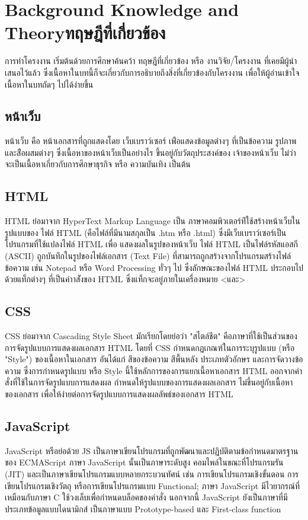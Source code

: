 \chapter{\ifenglish Background Knowledge and Theory\else ทฤษฎีที่เกี่ยวข้อง\fi}

การทำโครงงาน เริ่มต้นด้วยการศึกษาค้นคว้า ทฤษฎีที่เกี่ยวข้อง หรือ งานวิจัย/โครงงาน ที่เคยมีผู้นำเสนอไว้แล้ว ซึ่งเนื้อหาในบทนี้ก็จะเกี่ยวกับการอธิบายถึงสิ่งที่เกี่ยวข้องกับโครงงาน เพื่อให้ผู้อ่านเข้าใจเนื้อหาในบทถัดๆ ไปได้ง่ายขึ้น

\section{หน้าเว็บ}
หน้าเว็บ คือ หน้าเอกสารที่ถูกแสดงโดย เว็บเบราว์เซอร์ เพ่ือแสดงข้อมูลต่างๆ ที่เป็นข้อความ รูปภาพ และส่ือผสมต่างๆ ซึ่งเนื้อหาของหน้าเว็บเป็นอย่างไร ขึ้นอยู่กับวัตถุประสงค์ของ เจ้าของหน้าเว็บ ไม่ว่าจะเป็นเนื้อหาเกี่ยวกับการศึกษาธุรกิจ หรือ ความบันเทิง เป็นต้น


\section{ HTML}
HTML ย่อมาจาก HyperText Markup Language เป็น ภาษาคอมพิวเตอร์ท่ีใช้สร้างหน้าเว็บในรูปแบบของ ไฟล์ HTML (คือไฟล์ที่มีนามสกุลเป็น .htm หรือ .html) ซึ่งมีเว็บเบราว์เซอร์เป็นโปรแกรมที่ใช้แปลงไฟล์ HTML เพื่อ แสดงผลในรูปของหน้าเว็บ
ไฟล์ HTML เป็นไฟล์รหัสแอสกี (ASCII) ถูกบันทึกในรูปของไฟล์เอกสาร (Text File) ที่สามารถถูกสร้างจากโปรแกรมสร้างไฟล์ ข้อความ เช่น Notepad หรือ Word Processing ทั่วๆ ไป ซึ่งลักษณะของไฟล์ HTML ประกอบไปด้วยแท็กต่างๆ ที่เป็นคําาส่ังของ HTML ซึ่งแท็กจะอยู่ภายในเครื่องหมาย <และ>

\section{ CSS}
CSS ย่อมาจาก Cascading Style Sheet  มักเรียกโดยย่อว่า "สไตล์ชีต" คือภาษาที่ใช้เป็นส่วนของการจัดรูปแบบการแสดงผลเอกสาร  HTML โดยที่ CSS กำหนดกฏเกณฑ์ในการระบุรูปแบบ (หรือ "Style") ของเนื้อหาในเอกสาร 
อันได้แก่ สีของข้อความ สีพื้นหลัง ประเภทตัวอักษร และการจัดวางข้อความ ซึ่งการกำหนดรูปแบบ หรือ Style นี้ใช้หลักการของการแยกเนื้อหาเอกสาร HTML ออกจากคำสั่งที่ใช้ในการจัดรูปแบบการแสดงผล กำหนดให้รูปแบบของการแสดงผลเอกสาร 
ไม่ขึ้นอยู่กับเนื้อหาของเอกสาร เพื่อให้ง่ายต่อการจัดรูปแบบการแสดงผลลัพธ์ของเอกสาร HTML

\section{JavaScript}
JavaScript หรือย่อด้วย JS เป็นภาษาเขียนโปรแกรมที่ถูกพัฒนาและปฏิบัติตามข้อกำหนดมาตรฐานของ ECMAScript
ภาษา JavaScript นั้นเป็นภาษาระดับสูง คอมไพล์ในขณะที่โปรแกรมรัน (JIT) และเป็นภาษาเขียนโปรแกรมแบบหลายกระบวนทัศน์ เช่น การเขียนโปรแกรมเชิงขั้นตอน การเขียนโปรแกรมเชิงวัตถุ หรือการเขียนโปรแกรมแบบ Functional; 
ภาษา JavaScript มีไวยากรณ์ที่เหมือนกับภาษา C ใช้วงเล็บเพื่อกำหนดบล็อคของคำสั่ง นอกจากนี้ JavaScript ยังเป็นภาษาที่มีประเภทข้อมูลแบบไดนามิกส์ เป็นภาษาแบบ Prototype-based และ First-class function

